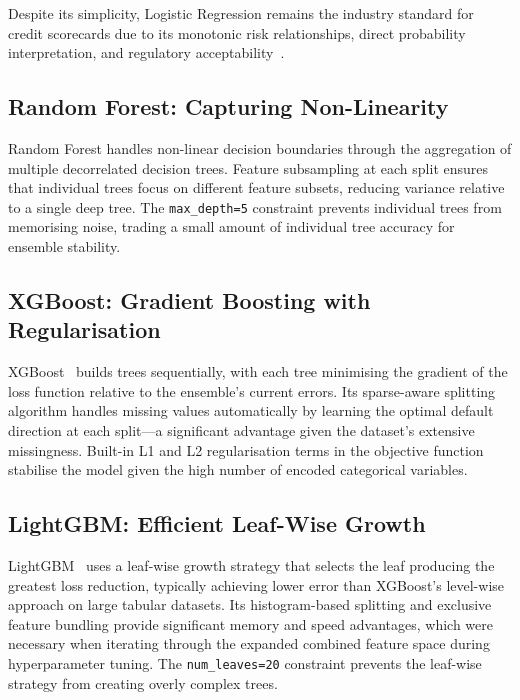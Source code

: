 Despite its simplicity, Logistic Regression remains the industry standard for credit scorecards due to its monotonic risk relationships, direct probability interpretation, and regulatory acceptability~\cite{siddiqi2012}.

\subsection{Random Forest: Capturing Non-Linearity}

Random Forest handles non-linear decision boundaries through the aggregation of multiple decorrelated decision trees. Feature subsampling at each split ensures that individual trees focus on different feature subsets, reducing variance relative to a single deep tree. The \texttt{max\_depth=5} constraint prevents individual trees from memorising noise, trading a small amount of individual tree accuracy for ensemble stability.

\subsection{XGBoost: Gradient Boosting with Regularisation}

XGBoost~\cite{chen2016} builds trees sequentially, with each tree minimising the gradient of the loss function relative to the ensemble's current errors. Its sparse-aware splitting algorithm handles missing values automatically by learning the optimal default direction at each split---a significant advantage given the dataset's extensive missingness. Built-in L1 and L2 regularisation terms in the objective function stabilise the model given the high number of encoded categorical variables.

\subsection{LightGBM: Efficient Leaf-Wise Growth}

LightGBM~\cite{ke2017} uses a leaf-wise growth strategy that selects the leaf producing the greatest loss reduction, typically achieving lower error than XGBoost's level-wise approach on large tabular datasets. Its histogram-based splitting and exclusive feature bundling provide significant memory and speed advantages, which were necessary when iterating through the expanded combined feature space during hyperparameter tuning. The \texttt{num\_leaves=20} constraint prevents the leaf-wise strategy from creating overly complex trees.

